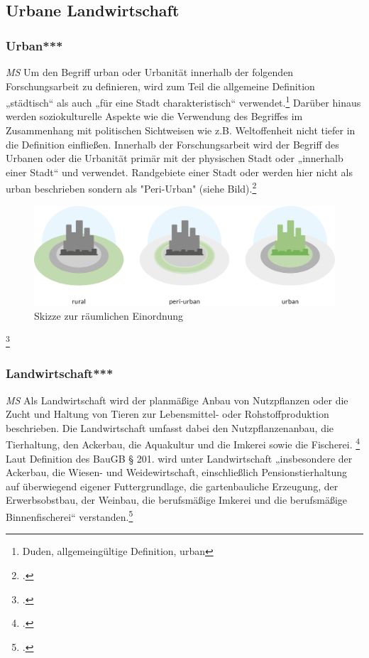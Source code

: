 \documentclass{scrartcl}
\begin{document}
\subsection{Urbane Landwirtschaft}

\subsubsection{Urban***}\textit{MS}
Um den Begriff urban oder Urbanität innerhalb der folgenden Forschungsarbeit zu definieren, wird zum Teil die allgemeine Definition „städtisch“ als auch „für eine Stadt charakteristisch“ verwendet.\footnote{Duden, allgemeingültige Definition, urban} Darüber hinaus werden soziokulturelle Aspekte wie die Verwendung des Begriffes im Zusammenhang mit politischen Sichtweisen wie z.B. Weltoffenheit nicht tiefer in die Definition einfließen. Innerhalb der Forschungsarbeit wird der Begriff des Urbanen oder die Urbanität primär mit der physischen Stadt oder „innerhalb einer Stadt“ und verwendet. Randgebiete einer Stadt oder werden hier nicht als urban beschrieben sondern als "Peri-Urban" (siehe Bild).\footcite[S. 140]{MullerUrbanStadt}

\begin{figure}[htbp]
\centering
\includegraphics[width=12cm]{image_folder/SchaubildUrbaneEingrenzungen.png}
\caption{Skizze zur räumlichen Einordnung}
\end{figure}
\footcite[]{Eigene Zeichnung, entstanden aus dem Vorbild von Carlos Tobisch, Oasen im Beton S.26, Abb.7}

\subsubsection{Landwirtschaft***}\textit{MS}
Als Landwirtschaft wird der planmäßige Anbau von Nutzpflanzen oder die Zucht und Haltung von Tieren zur Lebensmittel- oder Rohstoffproduktion beschrieben. Die Landwirtschaft umfasst dabei den Nutzpflanzenanbau, die Tierhaltung, den Ackerbau, die Aquakultur und die Imkerei sowie die Fischerei. \footcite[S. 5]{Lohrberg2001StadtnaheFreiraumplanung}  Laut Definition des BauGB § 201. wird unter Landwirtschaft „insbesondere der Ackerbau, die Wiesen- und Weidewirtschaft, einschließlich Pensionstierhaltung auf überwiegend eigener Futtergrundlage, die gartenbauliche Erzeugung, der Erwerbsobstbau, der Weinbau, die berufsmäßige Imkerei und die berufsmäßige Binnenfischerei“ verstanden.\footcite[§ 201]{}
\end{document}
